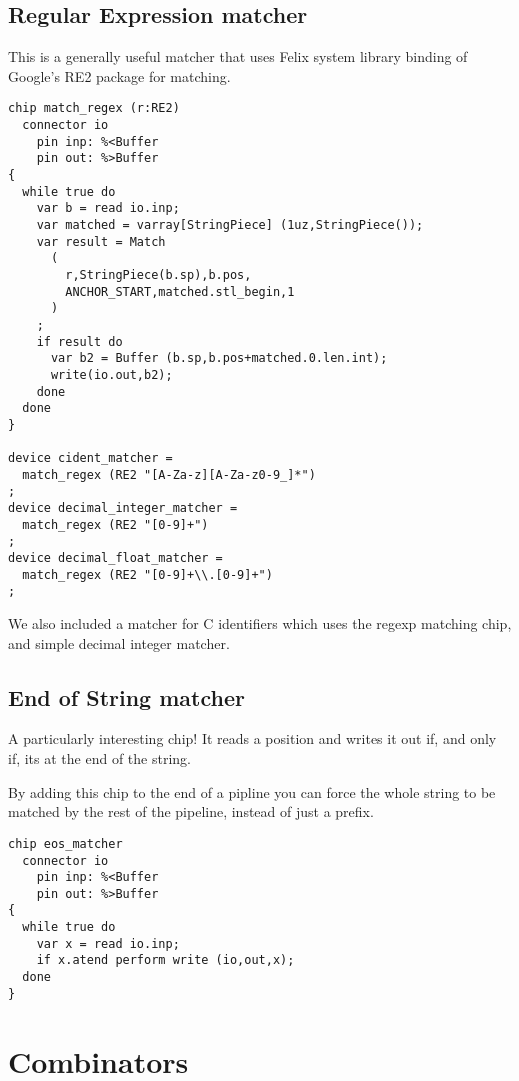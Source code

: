 \documentclass[oneside]{book}
\begin{document}
\subsection{Regular Expression matcher}
This is a generally useful matcher that uses
Felix system library binding of Google's RE2 package for matching. 

\begin{verbatim}
chip match_regex (r:RE2)
  connector io
    pin inp: %<Buffer
    pin out: %>Buffer
{
  while true do
    var b = read io.inp;
    var matched = varray[StringPiece] (1uz,StringPiece());
    var result = Match
      (
        r,StringPiece(b.sp),b.pos,
        ANCHOR_START,matched.stl_begin,1
      )
    ;
    if result do
      var b2 = Buffer (b.sp,b.pos+matched.0.len.int);
      write(io.out,b2);
    done
  done
}

device cident_matcher = 
  match_regex (RE2 "[A-Za-z][A-Za-z0-9_]*")
;
device decimal_integer_matcher = 
  match_regex (RE2 "[0-9]+")
;
device decimal_float_matcher = 
  match_regex (RE2 "[0-9]+\\.[0-9]+")
;
\end{verbatim}

We also included a matcher for C identifiers which uses the regexp
matching chip, and simple decimal integer matcher.


\subsection{End of String matcher}
A particularly interesting chip! It reads a position
and writes it out if, and only if, its at the end of the 
string.

By adding this chip to the end of a pipline you can force
the whole string to be matched by the rest of the pipeline,
instead of just a prefix.

\begin{verbatim}
chip eos_matcher 
  connector io
    pin inp: %<Buffer
    pin out: %>Buffer
{
  while true do
    var x = read io.inp;
    if x.atend perform write (io,out,x);
  done
}
\end{verbatim}

\section{Combinators}
\end{document}
